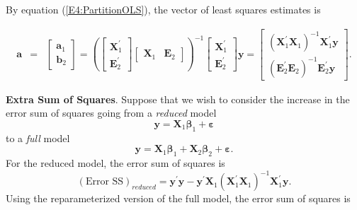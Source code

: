 By equation (\ref{E4:PartitionOLS}), the vector of least squares
estimates is

\begin{eqnarray} \label{E4:OVLSEstimates}
\mathbf{a} &=&
\begin{bmatrix}
\mathbf{a}_1 \\ \mathbf{b}_2
\end{bmatrix}
=\left(
\begin{bmatrix}
\mathbf{X}_1^{\prime} \\ \mathbf{E}_2^{\prime}
\end{bmatrix}
\begin{bmatrix}
\mathbf{X}_1 & \mathbf{E}_2
\end{bmatrix}
\right) ^{-1}
\begin{bmatrix}
\mathbf{X}_1^{\prime } \\ \mathbf{E}_2^{\prime}
\end{bmatrix}
\mathbf{y}
=
\begin{bmatrix}
\left( \mathbf{X}_1^{\prime} \mathbf{X}_1 \right)^{-1}
\mathbf{X}_1^{\prime} \mathbf{y} \\
\left( \mathbf{E}_2^{\prime}\mathbf{E}_2\right) ^{-1}
\mathbf{E}_2^{\prime}\mathbf{y}
\end{bmatrix} .
\end{eqnarray}


\textbf{Extra Sum of Squares}. Suppose that we wish to consider the
increase in the error sum of squares going from a \textit{reduced}
model
\begin{equation*}
\mathbf{y} = \mathbf{X}_1 \boldsymbol \beta_1 + \boldsymbol
\varepsilon
\end{equation*}
to a \textit{full} model
\begin{equation*}
\mathbf{y} = \mathbf{X}_1 \boldsymbol \beta_1 + \mathbf{X}_2
\boldsymbol \beta_2+ \boldsymbol \varepsilon.
\end{equation*}
For the reduced model, the error sum of squares is
\begin{equation}\label{E4:ESSReduced}
(\text{Error SS})_{reduced} = \mathbf{y}^{\prime} \mathbf{y} -
\mathbf{y}^{\prime} \mathbf{X}_1 (\mathbf{X}_1^{\prime}
\mathbf{X}_1)^{-1} \mathbf{X}_1^{\prime} \mathbf{y}.
\end{equation}
Using the reparameterized version of the full model, the error sum
of squares is

